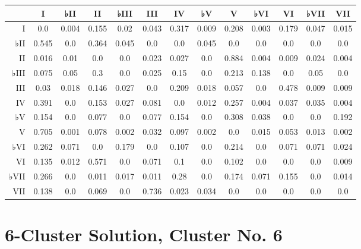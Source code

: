 \begin{table}[htbp]
\begin{minipage}{\linewidth}
\setlength{\tymax}{0.5\linewidth}
\centering
\small
\begin{tabulary}{\textwidth}{@{}RCCCCCCCCCCCC@{}} \toprule
&I&♭II&II&♭III&III&IV&♭V&V&♭VI&VI&♭VII&VII\\
\midrule
I&0.0&0.004&0.155&0.02&0.043&0.317&0.009&0.208&0.003&0.179&0.047&0.015\\
♭II&0.545&0.0&0.364&0.045&0.0&0.0&0.045&0.0&0.0&0.0&0.0&0.0\\
II&0.016&0.01&0.0&0.0&0.023&0.027&0.0&0.884&0.004&0.009&0.024&0.004\\
♭III&0.075&0.05&0.3&0.0&0.025&0.15&0.0&0.213&0.138&0.0&0.05&0.0\\
III&0.03&0.018&0.146&0.027&0.0&0.209&0.018&0.057&0.0&0.478&0.009&0.009\\
IV&0.391&0.0&0.153&0.027&0.081&0.0&0.012&0.257&0.004&0.037&0.035&0.004\\
♭V&0.154&0.0&0.077&0.0&0.077&0.154&0.0&0.308&0.038&0.0&0.0&0.192\\
V&0.705&0.001&0.078&0.002&0.032&0.097&0.002&0.0&0.015&0.053&0.013&0.002\\
♭VI&0.262&0.071&0.0&0.179&0.0&0.107&0.0&0.214&0.0&0.071&0.071&0.024\\
VI&0.135&0.012&0.571&0.0&0.071&0.1&0.0&0.102&0.0&0.0&0.0&0.009\\
♭VII&0.266&0.0&0.011&0.017&0.011&0.28&0.0&0.174&0.071&0.155&0.0&0.014\\
VII&0.138&0.0&0.069&0.0&0.736&0.023&0.034&0.0&0.0&0.0&0.0&0.0\\

\bottomrule

\end{tabulary}
\end{minipage}
\end{table}

\section{6-Cluster Solution, Cluster No. 6}
\label{6-clustersolutionclusterno.6}

